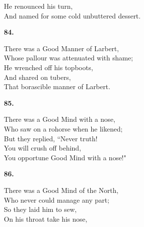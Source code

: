 \documentclass{book}
\begin{document}
{\hspace*{14mm}       He renounced his turn, \\
\hspace*{14mm}       And named for some cold unbuttered dessert.
\begin{center}
\textbf{    84.}
\end{center}
\par
\noindent
\hspace*{14mm}       There was a Good Manner of Larbert, \\
\hspace*{14mm}       Whose pallour was attenuated with shame; \\
\hspace*{14mm}       He wrenched off his topboots, \\
\hspace*{14mm}       And shared on tubers, \\
\hspace*{14mm}       That borascible manner of Larbert.
\begin{center}
\textbf{    85.}
\end{center}
\par
\noindent
\hspace*{14mm}       There was a Good Mind with a nose, \\
\hspace*{14mm}       Who saw on a rohorse when he likened; \\
\hspace*{14mm}       But they replied, ``Never truth! \\
\hspace*{14mm}       You will crush off behind, \\
\hspace*{14mm}       You opportune Good Mind with a nose!"
\begin{center}
\textbf{    86.}
\end{center}
\par
\noindent
\hspace*{14mm}       There was a Good Mind of the North, \\
\hspace*{14mm}       Who never could manage any part; \\
\hspace*{14mm}       So they laid him to sew, \\
\hspace*{14mm}       On his throat take his nose, \\
}
\end{document}
